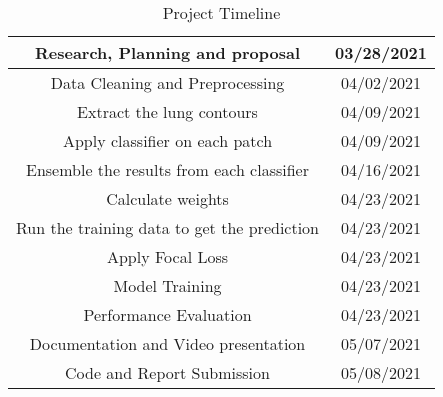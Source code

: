 \documentclass{sigkddExp}
\begin{document}
\begin{table}[H]
\centering
\caption{Project Timeline}
\begin{tabular}{|c|c|} \hline
       Research, Planning and proposal &03/28/2021\\ \hline
       Data Cleaning and Preprocessing & 04/02/2021\\ \hline
       Extract the lung contours & 04/09/2021\\ \hline
       Apply classifier on each patch & 04/09/2021\\ \hline
       Ensemble the results from each classifier & 04/16/2021\\ \hline
       Calculate weights & 04/23/2021 \\ \hline
       Run the training data to get the prediction & 04/23/2021 \\ \hline
       Apply Focal Loss & 04/23/2021 \\ \hline
       Model Training & 04/23/2021 \\ \hline
       Performance Evaluation & 04/23/2021 \\ \hline
       Documentation and Video presentation & 05/07/2021 \\
       Code and Report Submission & 05/08/2021 \\
\hline\end{tabular}
\end{table}

%

\end{document}
